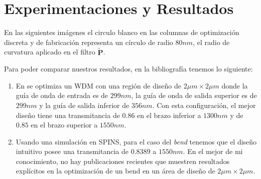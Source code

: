 \chapter{Experimentaciones y Resultados}

En las siguientes imágenes el circulo blanco en las columnas de optimización discreta y de fabricación
representa un círculo de radio $80nm$, el radio de curvatura aplicado en el filtro 
$\widetilde{\boldsymbol{P}}$.

Para poder comparar nuestros resultados, en la bibliografía tenemos lo siguiente:

\begin{enumerate}

  \item En \cite{Christiansen2021} se optimiza un WDM con una región de diseño de 
        $2 \mu m \times 2 \mu m$ donde la guía de onda de entrada es de $299 nm$,
        la guía de onda de salida superior es de $299 nm$ y la guía de salida inferior de $356 nm$.
        Con esta configuración, el mejor diseño tiene una transmitancia de $0.86$ en el brazo inferior
        a $1300 nm$ y de $0.85$ en el brazo superior a $1550 nm$.

  \item Usando una simulación en SPINS, para el caso del \emph{bend} tenemos que el diseño intuitivo
        posee una transmitancia de $0.8389$ a $1550 nm$.
        En el mejor de mi conocimiento, no hay publicaciones recientes que muestren resultados
        explícitos en la optimización de un bend en un área de diseño de $2 \mu m \times 2 \mu m$.

\end{enumerate}





